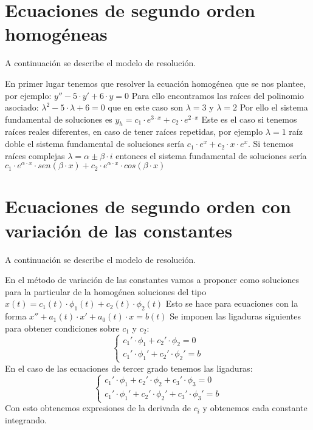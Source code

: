 
\section{Ecuaciones de segundo orden homogéneas}

\begin{ejer}
	A continuación se describe el modelo de resolución.
\end{ejer}
\begin{sol}
	En primer lugar tenemos que resolver la ecuación homogénea que se nos plantee, por ejemplo:  
	$y'' - 5\cdot y' + 6\cdot y = 0$  
	Para ello encontramos las raíces del polinomio asociado:  
	$\lambda ^2 - 5\cdot \lambda + 6 = 0$ que en este caso son $\lambda = 3$ y $\lambda  = 2$  
	Por ello el sistema fundamental de soluciones es $y_h = c_1\cdot e^{3\cdot x} + c_2\cdot e^{2\cdot x}$  
	Este es el caso si tenemos raíces reales diferentes, en caso de tener raíces repetidas, por ejemplo $\lambda = 1$ raíz doble el sistema fundamental de soluciones sería $c_1\cdot e^x + c_2\cdot x\cdot e^x$.  
	Si tenemos raíces complejas $\lambda = \alpha \pm \beta \cdot i$ entonces el sistema fundamental de soluciones sería $c_1\cdot e^{\alpha \cdot x}\cdot sen(\beta \cdot x) + c_2\cdot e^{\alpha \cdot x}\cdot cos(\beta \cdot x)$
\end{sol}


\section{Ecuaciones de segundo orden con variación de las constantes}

\begin{ejer}
	A continuación se describe el modelo de resolución.
\end{ejer}
\begin{sol}
	En el método de variación de las constantes vamos a proponer como soluciones para la particular de la homogénea soluciones del tipo $x(t) = c_1(t)\cdot \phi_1 (t) + c_2(t)\cdot \phi_2 (t)$  
	Esto se hace para ecuaciones con la forma $x'' + a_1 (t)\cdot x' + a_0 (t)\cdot x = b(t)$  
	Se imponen las ligaduras siguientes para obtener condiciones sobre $c_1$ y $c_2$:  
	$$
	\begin{cases}
	c_1'\cdot \phi_1 + c_2' \cdot \phi_2 = 0 \\
	c_1'\cdot \phi_1' + c_2'\cdot \phi_2' = b
	\end{cases}
	$$
	En el caso de las ecuaciones de tercer grado tenemos las ligaduras:  
	$$
	\begin{cases}
	c_1'\cdot \phi_1 + c_2'\cdot \phi_2 + c_3'\cdot \phi_3 = 0 \\
	c_1'\cdot \phi_1' + c_2'\cdot \phi_2' + c_3'\cdot \phi_3' = b
	\end{cases}
	$$
	Con esto obtenemos expresiones de la derivada de $c_i$ y obtenemos cada constante integrando.
\end{sol}
